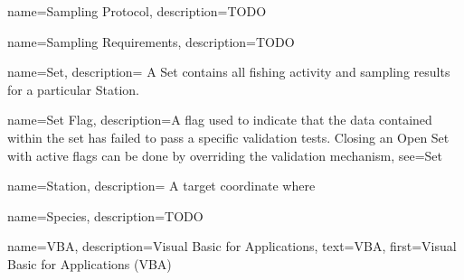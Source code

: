  {
  name=Sampling Protocol,
  description={TODO}
}

 {
  name=Sampling Requirements,
  description={TODO}
}
    
 {
  name=Set,
  description={
    A Set contains all fishing activity and sampling results for a particular \gls{Station}.
  }
}

 {
  name=Set Flag,
  description={A flag used to indicate that the data contained within the set has failed to pass a specific validation tests. 
  Closing an \gls{Open Set} with active flags can be done by overriding the validation mechanism},
  see=\gls{Set}
  }

 {
  name=Station,
  description={
    A target coordinate where
  }
}
  
 {
  name=Species,
  description={TODO}
}

 {
  name=VBA,
  description={Visual Basic for Applications},
  text={VBA},
  first={Visual Basic for Applications (VBA)}
}

\glsaddall
\glsaddallunused
